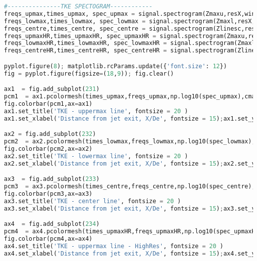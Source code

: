 \begin{lstlisting}[language=Python]
#---------------TKE SPECTOGRAM------------
freqs_upmax,times_upmax, spec_upmax = signal.spectrogram(Zmaxu,resX,window='hanning', nperseg=np.size(Zmaxu)/6, noverlap=np.size(Zmaxu)/6.04,detrend=False,scaling='spectrum');
freqs_lowmax,times_lowmax, spec_lowmax = signal.spectrogram(Zmaxl,resX,window='hanning', nperseg=np.size(Zmaxl)/6.00, noverlap=np.size(Zmaxl)/6.04,detrend=False, scaling='spectrum');
freqs_centre,times_centre, spec_centre = signal.spectrogram(Zlinesc,resX,window='hanning', nperseg=np.size(Zlinesc)/6.00, noverlap=np.size(Zlinesc)/6.04,detrend=False, scaling='spectrum');
freqs_upmaxHR,times_upmaxHR, spec_upmaxHR = signal.spectrogram(Zmaxu,resX,window='hanning', nperseg=np.size(Zmaxu)/2.00, noverlap=np.size(Zmaxu)/2.01,detrend=False, scaling='spectrum');
freqs_lowmaxHR,times_lowmaxHR, spec_lowmaxHR = signal.spectrogram(Zmaxl,resX,window='hanning', nperseg=np.size(Zmaxl)/2.00, noverlap=np.size(Zmaxl)/2.01,detrend=False, scaling='spectrum');
freqs_centreHR,times_centreHR, spec_centreHR = signal.spectrogram(Zlinesc,resX,window='hanning', nperseg=np.size(Zlinesc)/2.00, noverlap=np.size(Zlinesc)/2.01,detrend=False, scaling='spectrum');

pyplot.figure(8); matplotlib.rcParams.update({'font.size': 12})
fig = pyplot.figure(figsize=(18,9)); fig.clear()

ax1  = fig.add_subplot(231)
pcm1  = ax1.pcolormesh(times_upmax,freqs_upmax,np.log10(spec_upmax),cmap='jet')
fig.colorbar(pcm1,ax=ax1)
ax1.set_title('TKE - uppermax line', fontsize = 20 )  
ax1.set_xlabel('Distance from jet exit, X/De', fontsize = 15);ax1.set_ylabel('wavenumbers*De', fontsize = 15)

ax2 = fig.add_subplot(232)
pcm2  = ax2.pcolormesh(times_lowmax,freqs_lowmax,np.log10(spec_lowmax),cmap='jet')
fig.colorbar(pcm2,ax=ax2)
ax2.set_title('TKE - lowermax line', fontsize = 20 )  
ax2.set_xlabel('Distance from jet exit, X/De', fontsize = 15);ax2.set_ylabel('wavenumbers*De', fontsize = 15)

ax3  = fig.add_subplot(233)
pcm3  = ax3.pcolormesh(times_centre,freqs_centre,np.log10(spec_centre),cmap='jet')
fig.colorbar(pcm3,ax=ax3)
ax3.set_title('TKE - center line', fontsize = 20 )  
ax3.set_xlabel('Distance from jet exit, X/De', fontsize = 15);ax3.set_ylabel('wavenumbers*De', fontsize = 15)

ax4  = fig.add_subplot(234)
pcm4  = ax4.pcolormesh(times_upmaxHR,freqs_upmaxHR,np.log10(spec_upmaxHR),cmap='jet')
fig.colorbar(pcm4,ax=ax4)
ax4.set_title('TKE - uppermax line - HighRes', fontsize = 20 )  
ax4.set_xlabel('Distance from jet exit, X/De', fontsize = 15);ax4.set_ylabel('wavenumbers*De', fontsize = 15)


\end{lstlisting}
